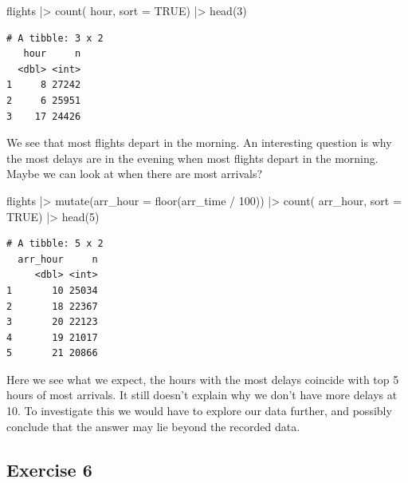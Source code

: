 \documentclass[
  letterpaper,
  DIV=11,
  numbers=noendperiod]{scrreprt}
\newenvironment{Shaded}{\begin{snugshade}}{\end{snugshade}}
\newcommand{\AttributeTok}[1]{\textcolor[rgb]{0.40,0.45,0.13}{#1}}
\newcommand{\ConstantTok}[1]{\textcolor[rgb]{0.56,0.35,0.01}{#1}}
\newcommand{\DecValTok}[1]{\textcolor[rgb]{0.68,0.00,0.00}{#1}}
\newcommand{\FunctionTok}[1]{\textcolor[rgb]{0.28,0.35,0.67}{#1}}
\newcommand{\NormalTok}[1]{\textcolor[rgb]{0.00,0.23,0.31}{#1}}
\newcommand{\SpecialCharTok}[1]{\textcolor[rgb]{0.37,0.37,0.37}{#1}}
\begin{document}
\begin{Shaded}
\begin{Highlighting}[]
\NormalTok{flights }\SpecialCharTok{|\textgreater{}}
  \FunctionTok{count}\NormalTok{(}
\NormalTok{    hour, }
    \AttributeTok{sort =} \ConstantTok{TRUE}\NormalTok{) }\SpecialCharTok{|\textgreater{}}
  \FunctionTok{head}\NormalTok{(}\DecValTok{3}\NormalTok{)}
\end{Highlighting}
\end{Shaded}

\begin{verbatim}
# A tibble: 3 x 2
   hour     n
  <dbl> <int>
1     8 27242
2     6 25951
3    17 24426
\end{verbatim}

We see that most flights depart in the morning. An interesting question
is why the most delays are in the evening when most flights depart in
the morning. Maybe we can look at when there are most arrivals?

\begin{Shaded}
\begin{Highlighting}[]
\NormalTok{flights }\SpecialCharTok{|\textgreater{}}
  \FunctionTok{mutate}\NormalTok{(}\AttributeTok{arr\_hour =} \FunctionTok{floor}\NormalTok{(arr\_time }\SpecialCharTok{/} \DecValTok{100}\NormalTok{)) }\SpecialCharTok{|\textgreater{}}
  \FunctionTok{count}\NormalTok{(}
\NormalTok{    arr\_hour, }
    \AttributeTok{sort =} \ConstantTok{TRUE}\NormalTok{) }\SpecialCharTok{|\textgreater{}}
  \FunctionTok{head}\NormalTok{(}\DecValTok{5}\NormalTok{)}
\end{Highlighting}
\end{Shaded}

\begin{verbatim}
# A tibble: 5 x 2
  arr_hour     n
     <dbl> <int>
1       10 25034
2       18 22367
3       20 22123
4       19 21017
5       21 20866
\end{verbatim}

Here we see what we expect, the hours with the most delays coincide with
top 5 hours of most arrivals. It still doesn't explain why we don't have
more delays at 10. To investigate this we would have to explore our data
further, and possibly conclude that the answer may lie beyond the
recorded data.

\subsection{Exercise 6}\label{exercise-6-4}
\end{document}
